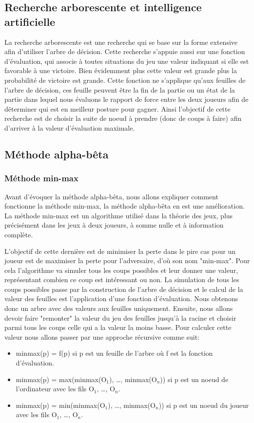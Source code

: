 \documentclass[a4paper, 12pt, french]{article}
\begin{document}
	\subsection{Recherche arborescente et intelligence artificielle}
	La recherche arborescente est une recherche qui se base sur la forme extensive afin d'utiliser l'arbre de
	décision\cite{cours_arbre_decision}.
	Cette recherche s'appuie aussi sur une fonction d'évaluation, qui associe à toutes situations du jeu une
	valeur indiquant si elle est favorable à une victoire. Bien évidemment plus cette valeur est grande plus
	la probabilité de victoire est grande. Cette fonction ne s'applique qu'aux feuilles de l'arbre de décision,
	ces feuille peuvent être la fin de la partie ou un état de la partie dans lequel nous évaluons le rapport de force
	entre les deux joueurs afin de déterminer qui est en meilleur posture pour gagner. Ainsi l'objectif de cette
	recherche est de choisir la suite de noeud à prendre (donc de coups à faire) afin d'arriver à la valeur
	d'évaluation maximale.

	\subsection{Méthode alpha-bêta}
	\subsubsection{Méthode min-max}
	Avant d'évoquer la méthode alpha-bêta, nous allons expliquer comment fonctionne la méthode min-max,
	la méthode alpha-bêta en est une amélioration. La méthode min-max est un algorithme utilisé dans la théorie des
	jeux, plus précisément dans les jeux à deux joueurs, à somme nulle et à information complète\cite{min_max}.

	L'objectif de cette dernière est de minimiser la perte dans le pire cas pour un joueur est de maximiser
	la perte pour l'adversaire, d'où son nom "min-max". Pour cela l'algorithme va simuler tous les coups
	possibles et leur donner une valeur, représentant combien ce coup est intéressant ou non.
	La simulation de tous les coups possibles passe par la construction de l'arbre de décision et
	le calcul de la valeur des feuilles est l'application d'une fonction d'évaluation. Nous obtenons donc
	un arbre avec des valeurs aux feuilles uniquement. Ensuite, nous allons devoir faire "remonter" la valeur
	du jeu des feuilles jusqu'à la racine et choisir parmi tous les coups celle qui a la valeur la moins basse. Pour
	calculer cette valeur nous allons passer par une approche récursive comme suit\cite{minimax_alog}:
	\begin{itemize}
		\item minmax(p) = f(p) si p est un feuille de l'arbre où f est la fonction d'évaluation.
		\item minmax(p) = max(minmax(O$_1$), \ldots, minmax(O$_n$)) si p est un noeud de l'ordinateur avec les
			fils O$_1$, \ldots, O$_n$.
		\item minmax(p) = min(minmax(O$_1$), \ldots, minmax(O$_n$)) si p est un noeud du joueur avec les fils
			O$_1$, \ldots, O$_n$.
	\end{itemize}
\end{document}
